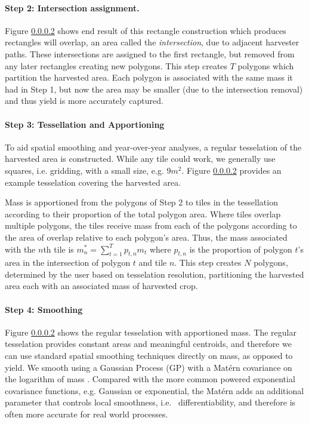 \paragraph{Step 2: Intersection assignment.}  Figure \ref{} shows end
result of this rectangle construction which produces rectangles will
overlap, an area called the \emph{intersection}, due to adjacent
harvester paths.  These intersections are assigned to the first
rectangle, but removed from any later rectangles creating new
polygons.  This step creates $T$ polygons which partition the
harvested area.  Each polygon is associated with the same mass it had
in Step 1, but now the area may be smaller (due to the intersection
removal) and thus yield is more accurately captured.

\paragraph*{Step 3: Tessellation and Apportioning} To aid spatial
smoothing and year-over-year analyses, a regular tesselation of the
harvested area is constructed.  While any tile could work, we
generally use squares, i.e. gridding, with a small size, e.g. $9 m^2$.
Figure \ref{} provides an example tesselation covering the harvested
area.

Mass is apportioned from the polygons of Step 2 to tiles in the
tessellation according to their proportion of the total polygon
area. Where tiles overlap multiple polygons, the tiles receive mass
from each of the polygons according to the area of overlap relative to
each polygon's area.  Thus, the mass associated with the $n$th tile is
$m_n^* = \sum_{t=1}^T p_{t,n} m_t$ where $p_{t,n}$ is the proportion
of polygon $t$'s area in the intersection of polygon $t$ and tile $n$.
This step creates $N$ polygons, determined by the user based on
tesselation resolution, partitioning the harvested area each with an
associated mass of harvested crop.

\paragraph{Step 4: Smoothing} Figure \ref{} shows the regular
tesselation with apportioned mass.  The regular tesselation provides
constant areas and meaningful centroids, and therefore we can use
standard spatial smoothing techniques directly on mass, as opposed to
yield.  We smooth using a Gaussian Process (GP) with a Mat\'ern
covariance on the logarithm of mass
\citep{handcock1993bayesian,gutt2006studies}.  Compared with the more
common powered exponential covariance functions, e.g. Gaussian or
exponential, the Mat\'ern adds an additional parameter that controls
local smoothness, i.e. \ differentiability, and therefore is often more
accurate for real world processes.

